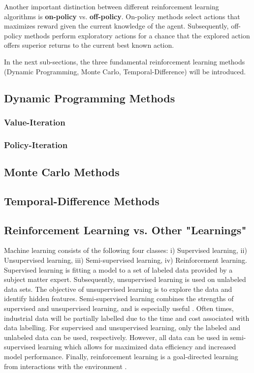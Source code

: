 Another important distinction between different reinforcement learning algorithms is \textbf{on-policy} vs. \textbf{off-policy}.  On-policy methods select actions that maximizes reward given the current knowledge of the agent.  Subsequently, off-policy methods perform exploratory actions for a chance that the explored action offers superior returns to the current best known action.

In the next sub-sections, the three fundamental reinforcement learning methods (Dynamic Programming, Monte Carlo, Temporal-Difference) will be introduced.

\subsection{Dynamic Programming Methods}
\subsubsection{Value-Iteration}
\subsubsection{Policy-Iteration}
\subsection{Monte Carlo Methods}
\subsection{Temporal-Difference Methods}
\subsection{Reinforcement Learning vs. Other "Learnings"}

Machine learning consists of the following four classes: i) Supervised learning, ii) Unsupervised learning, iii) Semi-supervised learning, iv) Reinforcement learning.  Supervised learning is fitting a model to a set of labeled data provided by a subject matter expert.  Subsequently, unsupervised learning is used on unlabeled data sets.  The objective of unsupervised learning is to explore the data and identify hidden features. Semi-supervised learning combines the strengths of supervised and unsupervised learning, and is especially useful \cite{machine_learning}.  Often times, industrial data will be partially labelled due to the time and cost associated with data labelling.  For supervised and unsupervised learning, only the labeled and unlabeled data can be used, respectively.  However, all data can be used in semi-supervised learning which allows for maximized data efficiency and increased model performance. Finally, reinforcement learning is a goal-directed learning from interactions with the environment \cite{sutton}.

